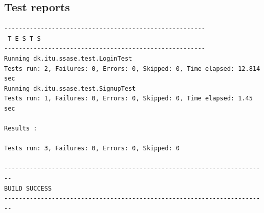 \documentclass[a4paper]{article}
\begin{document}
\subsection{Test reports}
\begin{verbatim}
-------------------------------------------------------
 T E S T S
-------------------------------------------------------
Running dk.itu.ssase.test.LoginTest
Tests run: 2, Failures: 0, Errors: 0, Skipped: 0, Time elapsed: 12.814 sec
Running dk.itu.ssase.test.SignupTest
Tests run: 1, Failures: 0, Errors: 0, Skipped: 0, Time elapsed: 1.45 sec

Results :

Tests run: 3, Failures: 0, Errors: 0, Skipped: 0

------------------------------------------------------------------------
BUILD SUCCESS
------------------------------------------------------------------------
\end{verbatim}


\end{document}
